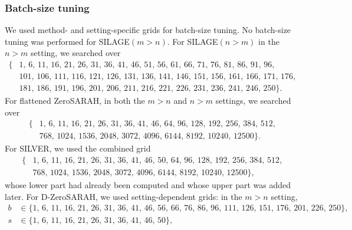 \documentclass{article}
\theoremstyle{plain}
\newcommand{\algname}[1]{{\sf\scalefont{0.88}\color{mydarkgreen}#1}\xspace}
\def\algname#1{#1}%
\begin{document}
\subsubsection{Batch-size tuning}
We used method- and setting-specific grids for batch-size tuning. No batch-size tuning was performed for \algname{SILAGE}$(m>n)$. For \algname{SILAGE}$(n>m)$ in the $n>m$ setting, we searched over
\begin{equation*}
\begin{aligned}
\{ &1,\, 6,\, 11,\, 16,\, 21,\, 26,\, 31,\, 36,\, 41,\, 46,\, 51,\, 56,\, 61,\, 66,\, 71,\, 76,\, 81,\, 86,\, 91,\, 96,\, \\
   &101,\, 106,\, 111,\, 116,\, 121,\, 126,\, 131,\, 136,\, 141,\, 146,\, 151,\, 156,\, 161,\, 166,\, 171,\, 176,\, \\
   &181,\, 186,\, 191,\, 196,\, 201,\, 206,\, 211,\, 216,\, 221,\, 226,\, 231,\, 236,\, 241,\, 246,\, 250 \}.
\end{aligned}
\end{equation*}
For flattened \algname{ZeroSARAH}, in both the $m>n$ and $n>m$ settings, we searched over
\begin{equation*}
\begin{aligned}
\{ &1,\, 6,\, 11,\, 16,\, 21,\, 26,\, 31,\, 36,\, 41,\, 46,\, 64,\, 96,\, 128,\, 192,\, 256,\, 384,\, 512,\, \\
   &768,\, 1024,\, 1536,\, 2048,\, 3072,\, 4096,\, 6144,\, 8192,\, 10240,\, 12500 \}.
\end{aligned}
\end{equation*}
For \algname{SILVER}, we used the combined grid
\begin{equation*}
\begin{aligned}
\{ &1,\, 6,\, 11,\, 16,\, 21,\, 26,\, 31,\, 36,\, 41,\, 46,\, 50,\, 64,\, 96,\, 128,\, 192,\, 256,\, 384,\, 512,\, \\
   &768,\, 1024,\, 1536,\, 2048,\, 3072,\, 4096,\, 6144,\, 8192,\, 10240,\, 12500 \},
\end{aligned}
\end{equation*}
whose lower part had already been computed and whose upper part was added later. For \algname{D-ZeroSARAH}, we used setting-dependent grids: in the $m>n$ setting,
\begin{equation*}
\begin{aligned}
b &\in \{1,\, 6,\, 11,\, 16,\, 21,\, 26,\, 31,\, 36,\, 41,\, 46,\, 56,\, 66,\, 76,\, 86,\, 96,\, 111,\, 126,\, 151,\, 176,\, 201,\, 226,\, 250\}, \\
s &\in \{1,\, 6,\, 11,\, 16,\, 21,\, 26,\, 31,\, 36,\, 41,\, 46,\, 50\},
\end{aligned}
\end{equation*}
\end{document}
